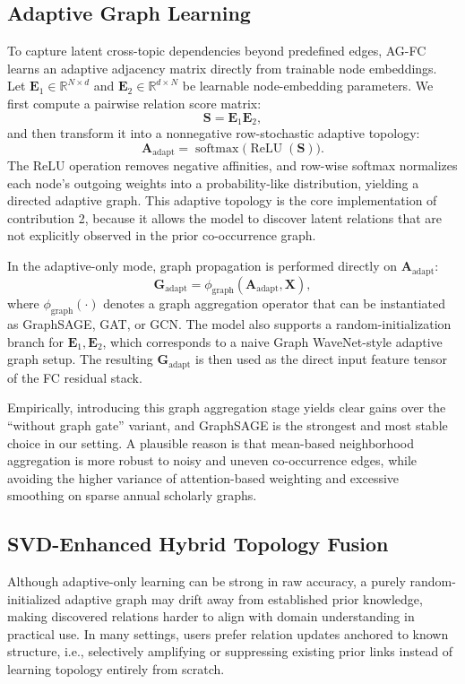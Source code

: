 \documentclass[runningheads]{llncs}
\begin{document}
\subsection{Adaptive Graph Learning}
To capture latent cross-topic dependencies beyond predefined edges, AG-FC learns an adaptive adjacency matrix directly from trainable node embeddings. Let $\mathbf{E}_1\in\mathbb{R}^{N\times d}$ and $\mathbf{E}_2\in\mathbb{R}^{d\times N}$ be learnable node-embedding parameters. We first compute a pairwise relation score matrix:
\begin{equation}
\mathbf{S}=\mathbf{E}_1\mathbf{E}_2,
\end{equation}
and then transform it into a nonnegative row-stochastic adaptive topology:
\begin{equation}
\mathbf{A}_{\text{adapt}}=\operatorname{softmax}\bigl(\operatorname{ReLU}(\mathbf{S})\bigr).
\end{equation}
The ReLU operation removes negative affinities, and row-wise softmax normalizes each node's outgoing weights into a probability-like distribution, yielding a directed adaptive graph. This adaptive topology is the core implementation of contribution 2, because it allows the model to discover latent relations that are not explicitly observed in the prior co-occurrence graph.

In the adaptive-only mode, graph propagation is performed directly on $\mathbf{A}_{\text{adapt}}$:
\begin{equation}
\mathbf{G}_{\text{adapt}}=\phi_{\text{graph}}(\mathbf{A}_{\text{adapt}},\mathbf{X}),
\end{equation}
where $\phi_{\text{graph}}(\cdot)$ denotes a graph aggregation operator that can be instantiated as GraphSAGE, GAT, or GCN. The model also supports a random-initialization branch for $\mathbf{E}_1,\mathbf{E}_2$, which corresponds to a naive Graph WaveNet-style adaptive graph setup.
The resulting $\mathbf{G}_{\text{adapt}}$ is then used as the direct input feature tensor of the FC residual stack.

Empirically, introducing this graph aggregation stage yields clear gains over the ``without graph gate'' variant, and GraphSAGE is the strongest and most stable choice in our setting. A plausible reason is that mean-based neighborhood aggregation is more robust to noisy and uneven co-occurrence edges, while avoiding the higher variance of attention-based weighting and excessive smoothing on sparse annual scholarly graphs.

\subsection{SVD-Enhanced Hybrid Topology Fusion}
Although adaptive-only learning can be strong in raw accuracy, a purely random-initialized adaptive graph may drift away from established prior knowledge, making discovered relations harder to align with domain understanding in practical use. In many settings, users prefer relation updates anchored to known structure, i.e., selectively amplifying or suppressing existing prior links instead of learning topology entirely from scratch.
\end{document}

